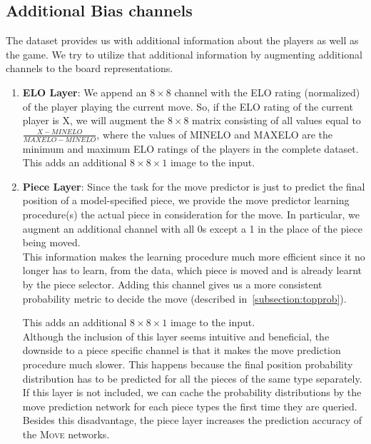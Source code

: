 \subsection{Additional Bias channels}
The dataset provides us with additional information about the players as well 
as 
the game. We try to utilize that additional information by augmenting 
additional 
channels to the board representations. 
\begin{enumerate}
\item \textbf{ELO Layer}: We append an $8\times 8$ channel with the ELO rating 
(normalized) of the player playing the current move. So, if the ELO rating of 
the current player is X, we will augment the $8\times 8$ matrix consisting of 
all values equal to $\frac{X-MINELO}{MAXELO-MINELO}$, where the values of 
MINELO 
and MAXELO are the minimum and maximum ELO ratings of the players in the 
complete dataset. This adds an additional $8\times 8\times 1$ image to the 
input.

\item \textbf{Piece Layer}: Since the task for the move predictor is just to 
predict the final position of a model-specified piece, we provide the move 
predictor learning procedure(s) the actual piece in consideration for the move. 
In particular, we augment an additional channel with all 0s except a 1 in the 
place of the piece being moved.\\
This information makes the learning procedure much more efficient since it no 
longer has to learn, from the data, which piece is moved and is already learnt 
by the piece selector. Adding this channel gives us a more consistent 
probability metric to decide the move (described in~\ref{subsection:topprob}).

This adds an additional $8\times 8\times 1$ image to the input.\\
Although the inclusion of this layer seems intuitive and beneficial, the 
downside to a piece specific channel is that it makes the move prediction 
procedure much slower. This happens because the final position probability 
distribution has to be predicted for all the pieces of the same type 
separately. 
If this layer is not included, we can cache the probability distributions by 
the 
move prediction network for each piece types the first time they are queried. 
Besides this disadvantage, the piece layer increases the prediction accuracy of 
the \textsc{Move} networks. 


\end{enumerate}
